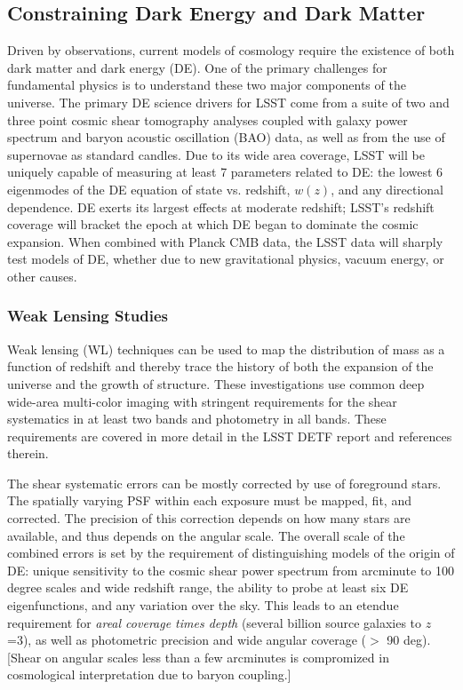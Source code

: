 \subsection{Constraining Dark Energy and Dark Matter}

Driven by observations, current models of cosmology require the existence
of both dark matter and dark energy (DE). One of the primary challenges for
fundamental physics is to understand these two major components of the
universe. The primary DE science drivers for LSST come from a suite of two
and three point cosmic shear tomography analyses coupled with galaxy power
spectrum and baryon acoustic oscillation (BAO) data, as well as from the
use of supernovae as standard candles. Due to its wide area coverage, LSST
will be uniquely capable of measuring at least 7 parameters related to DE:
the lowest 6 eigenmodes of the DE equation of state vs. redshift, $w(z)$, and
any directional dependence.  DE exerts its largest effects at moderate
redshift; LSST's redshift coverage will bracket the epoch at which DE began
to dominate the cosmic expansion. When combined with Planck CMB data, the
LSST data will sharply test models of DE, whether due to new
gravitational physics, vacuum energy, or other causes.


\subsubsection{Weak Lensing Studies}

Weak lensing (WL) techniques can be used to map the distribution of mass as a function
of redshift and thereby trace the history of both the expansion of the universe and the
growth of structure. These investigations use common deep wide-area multi-color imaging with stringent
requirements for the shear systematics in at least two bands and photometry in all bands.
These requirements are covered in more detail in the LSST DETF report and references therein.

The shear systematic errors can be mostly corrected by use of foreground stars.
The spatially varying PSF within each exposure must be mapped, fit, and corrected. The precision of this
correction depends on how many stars are available, and thus depends on the angular scale.
The overall scale of the combined errors is set by the requirement of distinguishing models
of the origin of DE: unique sensitivity to the cosmic shear power spectrum from arcminute
to 100 degree scales and wide redshift range, the ability to probe at least six DE
eigenfunctions, and any variation over the sky. This leads to an etendue requirement
for {\it areal coverage times depth} (several billion source galaxies to $z$=3), as well
as photometric precision and wide angular coverage ($>$ 90 deg).  [Shear on angular scales
less than a few arcminutes is compromized in cosmological interpretation due to baryon
coupling.]

